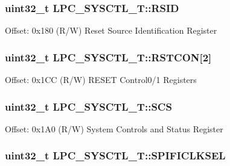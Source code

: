 \hypertarget{structLPC__SYSCTL__T_a50cd4f8d03ea4b39516add82ac2dfd1a}{
\subsubsection[{R\-S\-I\-D}]{ uint32\-\_\-t L\-P\-C\-\_\-\-S\-Y\-S\-C\-T\-L\-\_\-\-T\-::\-R\-S\-I\-D}}\label{structLPC__SYSCTL__T_a50cd4f8d03ea4b39516add82ac2dfd1a}
Offset\-: 0x180 (R/\-W) Reset Source Identification Register \hypertarget{structLPC__SYSCTL__T_ae7fbeba7b7acf3f7759d1de9eaf39ea1}{
\subsubsection[{R\-S\-T\-C\-O\-N}]{ uint32\-\_\-t L\-P\-C\-\_\-\-S\-Y\-S\-C\-T\-L\-\_\-\-T\-::\-R\-S\-T\-C\-O\-N\mbox{[}2\mbox{]}}}\label{structLPC__SYSCTL__T_ae7fbeba7b7acf3f7759d1de9eaf39ea1}
Offset\-: 0x1\-C\-C (R/\-W) R\-E\-S\-E\-T Control0/1 Registers \hypertarget{structLPC__SYSCTL__T_a90bf168dbcc04b27d230b74b5e4d17a6}{
\subsubsection[{S\-C\-S}]{ uint32\-\_\-t L\-P\-C\-\_\-\-S\-Y\-S\-C\-T\-L\-\_\-\-T\-::\-S\-C\-S}}\label{structLPC__SYSCTL__T_a90bf168dbcc04b27d230b74b5e4d17a6}
Offset\-: 0x1\-A0 (R/\-W) System Controls and Status Register \hypertarget{structLPC__SYSCTL__T_a8b3afcd7f261d6efbaa9756a14b2172f}{
\subsubsection[{S\-P\-I\-F\-I\-C\-L\-K\-S\-E\-L}]{ uint32\-\_\-t L\-P\-C\-\_\-\-S\-Y\-S\-C\-T\-L\-\_\-\-T\-::\-S\-P\-I\-F\-I\-C\-L\-K\-S\-E\-L}}\label{structLPC__SYSCTL__T_a8b3afcd7f261d6efbaa9756a14b2172f}
